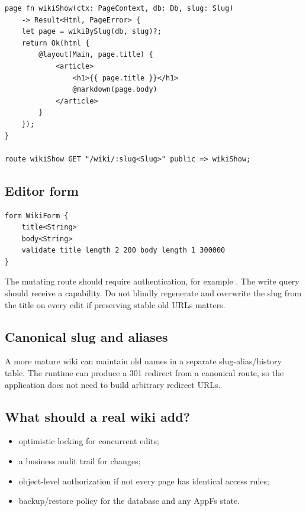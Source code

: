 \begin{lstlisting}[language=RWLang]
page fn wikiShow(ctx: PageContext, db: Db, slug: Slug)
    -> Result<Html, PageError> {
    let page = wikiBySlug(db, slug)?;
    return Ok(html {
        @layout(Main, page.title) {
            <article>
                <h1>{{ page.title }}</h1>
                @markdown(page.body)
            </article>
        }
    });
}

route wikiShow GET "/wiki/:slug<Slug>" public => wikiShow;
\end{lstlisting}

\subsection*{Editor form}

\begin{lstlisting}[language=RWLang]
form WikiForm {
    title<String>
    body<String>
    validate title length 2 200 body length 1 300000
}
\end{lstlisting}

The mutating route should require authentication, for example . The write query should receive a  capability. Do not blindly regenerate and overwrite the slug from the title on every edit if preserving stable old URLs matters.

\subsection*{Canonical slug and aliases}

A more mature wiki can maintain old names in a separate slug-alias/history table. The runtime can produce a 301 redirect from a canonical route, so the application does not need to build arbitrary redirect URLs.

\subsection*{What should a real wiki add?}

\begin{itemize}
  \item optimistic locking for concurrent edits;
  \item a business audit trail for changes;
  \item object-level authorization if not every page has identical access rules;
  \item backup/restore policy for the database and any AppFs state.
\end{itemize}

